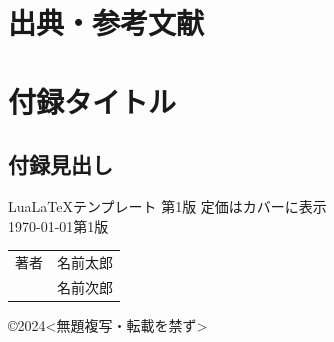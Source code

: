 \documentclass[11pt,a4paper, titlepage]{ltjsarticle}
\let\origsection\section
\let\origsubsection\subsection
\newcommand{\chapter}{\origsection}
\renewcommand{\section}{\origsubsection}
\renewcommand{\subsection}{\subsubsection}
\newcommand{\記}{\begin{center} 記 \end{center}}
\newcommand{\挨拶}{\noindent 拝啓 \ifcase\month\or 厳寒\or 春寒\or 早春
    \or 陽寒\or 新緑\or 向暑\or 猛暑\or 残暑\or 初秋\or 仲秋\or 晩秋\or 初冬
    \fi の候, ますますご清栄のこととお喜び申し上げます.}
\begin{document}
\chapter{出典・参考文献}



\appendix
\chapter{付録タイトル \label{apd:1}}
\section{付録見出し}

\newpage
\printindex  %


\begin{screen}
    {\Large Lua\LaTeX テンプレート 第1版} 定価はカバーに表示\\
    {\today 第1版}
    \begin{table}[H]
        \centering
        \renewcommand{\arraystretch}{0.8}
        \begin{tabular}{ll}
            著者 & 名前太郎 \\
               & 名前次郎 \\
        \end{tabular}
        \renewcommand{\arraystretch}{1}
    \end{table}
    ©2024<無題複写・転載を禁ず>
\end{screen}
\end{document}
